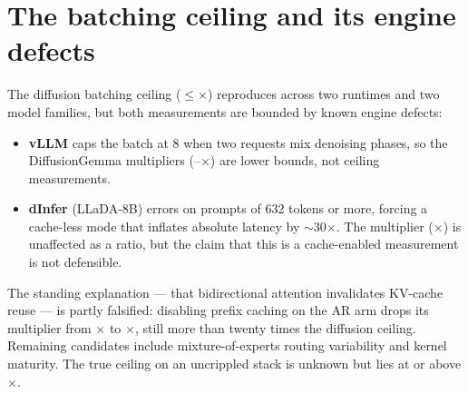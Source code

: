 \section{The batching ceiling and its engine defects}
\label{app:batching} The diffusion batching ceiling ($\leq$\dgBatchVllmHi$\times$) reproduces across
two runtimes and two model families, but both measurements are bounded by
known engine defects: \begin{itemize}
\item \textbf{vLLM} caps the batch at 8 when two requests mix denoising
phases, so the DiffusionGemma multipliers
(\dgBatchVllmLo--\dgBatchVllmHi$\times$) are lower bounds, not ceiling
measurements. \item \textbf{dInfer} (LLaDA-8B) errors on prompts of 632 tokens or more,
forcing a cache-less mode that inflates absolute latency by $\sim$30$\times$.
The multiplier (\dgBatchMult$\times$) is unaffected as a ratio, but the
claim that this is a cache-enabled measurement is not defensible.
\end{itemize} The standing explanation --- that bidirectional attention invalidates KV-cache
reuse --- is partly falsified: disabling prefix caching on the AR arm drops
its multiplier from \cacheOnMult$\times$ to \cacheOffMult$\times$, still more
than twenty times the diffusion ceiling. Remaining candidates include
mixture-of-experts routing variability and kernel maturity. The true ceiling
on an uncrippled stack is unknown but lies at or above \dgBatchVllmHi$\times$.

